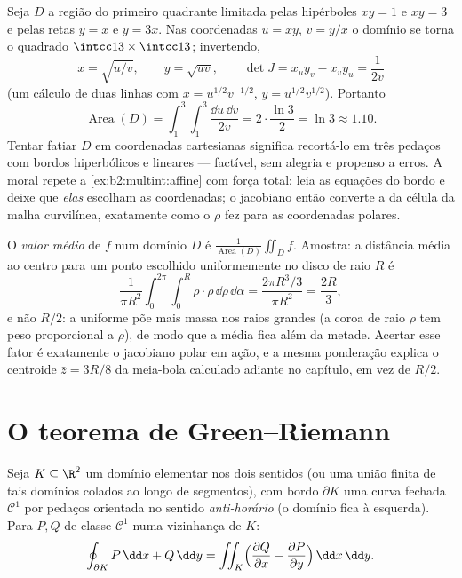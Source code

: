 \begin{example}\label{ex:b2:multint:hyperbolicregion}
Seja $D$ a região do primeiro quadrante limitada pelas
hipérboles $xy = 1$ e $xy = 3$ e pelas retas $y = x$ e
$y = 3x$. Nas coordenadas $u = xy$, $v = y/x$ o domínio
se torna o quadrado $\intcc13 \times \intcc13$; invertendo,
\[
x = \sqrt{u/v}, \qquad y = \sqrt{uv},
\qquad
\det J = x_uy_v - x_vy_u = \frac{1}{2v}
\]
(um cálculo de duas linhas com $x = u^{1/2}v^{-1/2}$, $y =
u^{1/2}v^{1/2}$). Portanto
\[
\operatorname{Area}(D)
= \int_1^3\!\!\int_1^3\frac{\dd u\,\dd v}{2v}
= 2\cdot\frac{\ln 3}{2} = \ln 3 \approx 1.10 .
\]
Tentar fatiar $D$ em coordenadas cartesianas significa recortá-lo
em três pedaços com bordos hiperbólicos e lineares ---
factível, sem alegria e propenso a erros. A moral repete a
\cref{ex:b2:multint:affine} com força total: leia as
equações do bordo e deixe que \emph{elas} escolham as
coordenadas; o jacobiano então converte a  da célula da
malha curvilínea, exatamente como o $\rho$ fez para as coordenadas
polares.
\end{example}

\begin{example}\label{ex:b2:multint:average}
O \emph{valor médio} de $f$ num domínio $D$ é
$\frac1{\operatorname{Area}(D)}\iint_Df$. Amostra: a distância
média ao centro para um ponto escolhido uniformemente no
disco de raio $R$ é
\[
\frac{1}{\pi R^2}\int_0^{2\pi}\!\!\int_0^R
\rho\cdot\rho\,\dd\rho\,\dd\alpha
= \frac{2\pi R^3/3}{\pi R^2} = \frac{2R}3 ,
\]
e não $R/2$: a  uniforme põe mais massa nos raios grandes (a
coroa de raio $\rho$ tem peso proporcional a $\rho$),
de modo que a média fica além da metade. Acertar esse
fator é exatamente o jacobiano polar em ação, e a
mesma ponderação explica o centroide $\bar z = 3R/8$ da
meia-bola calculado adiante no capítulo, em vez de $R/2$.
\end{example}

\section{O teorema de Green--Riemann}

\begin{theorem}\label{thm:b2:multint:green}
Seja $K \subseteq \R^2$ um domínio  elementar nos
dois sentidos (ou uma união finita de tais domínios colados ao longo de segmentos),
com bordo $\partial K$ uma curva fechada $\mathcal{C}^1$ por pedaços
orientada no sentido \emph{anti-horário} (o domínio fica à
esquerda). Para $P, Q$ de classe $\mathcal{C}^1$ numa vizinhança de
$K$:
\[
\oint_{\partial K} P\,\dd x + Q\,\dd y
= \iint_K \Bigl(\frac{\partial Q}{\partial x}
- \frac{\partial P}{\partial y}\Bigr)\,\dd x\,\dd y .
\]
\end{theorem}

